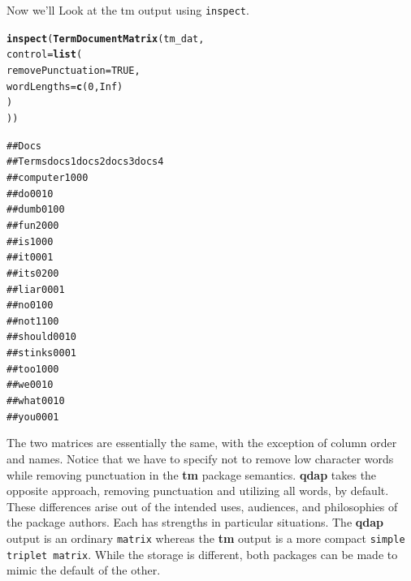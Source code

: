 \documentclass{article}\usepackage[]{graphicx}\usepackage[]{color}
\makeatletter
\newcommand{\hlnum}[1]{\textcolor[rgb]{0.686,0.059,0.569}{#1}}%
\newcommand{\hlstd}[1]{\textcolor[rgb]{0.345,0.345,0.345}{#1}}%
\newcommand{\hlkwc}[1]{\textcolor[rgb]{0.333,0.667,0.333}{#1}}%
\newcommand{\hlkwd}[1]{\textcolor[rgb]{0.737,0.353,0.396}{\textbf{#1}}}%
\newenvironment{kframe}{%
 \def\at@end@of@kframe{}%
 \ifinner\ifhmode%
  \def\at@end@of@kframe{\end{minipage}}%
  \begin{minipage}{\columnwidth}%
 \fi\fi%
 \def\FrameCommand##1{\hskip\@totalleftmargin \hskip-\fboxsep
 \colorbox{shadecolor}{##1}\hskip-\fboxsep
     \hskip-\linewidth \hskip-\@totalleftmargin \hskip\columnwidth}%
 \MakeFramed {\advance\hsize-\width
   \@totalleftmargin\z@ \linewidth\hsize
   \@setminipage}}%
 {\par\unskip\endMakeFramed%
 \at@end@of@kframe}
\newenvironment{knitrout}{}{} %
\makeatother
\begin{document}
\noindent Now we'll Look at the tm output using \texttt{inspect}.

\begin{knitrout}
\color{fgcolor}\begin{kframe}
\begin{alltt}
\hlkwd{inspect}\hlstd{(}\hlkwd{TermDocumentMatrix}\hlstd{(tm_dat,}
    \hlkwc{control} \hlstd{=} \hlkwd{list}\hlstd{(}
        \hlkwc{removePunctuation} \hlstd{=} \hlnum{TRUE}\hlstd{,}
        \hlkwc{wordLengths}\hlstd{=}\hlkwd{c}\hlstd{(}\hlnum{0}\hlstd{,} \hlnum{Inf}\hlstd{)}
    \hlstd{)}
\hlstd{))}
\end{alltt}
\end{kframe}
\end{knitrout}


\begin{knitrout}
\color{fgcolor}\begin{kframe}
\begin{alltt}
##           Docs
## Terms      docs 1 docs 2 docs 3 docs 4
##   computer      1      0      0      0
##   do            0      0      1      0
##   dumb          0      1      0      0
##   fun           2      0      0      0
##   is            1      0      0      0
##   it            0      0      0      1
##   its           0      2      0      0
##   liar          0      0      0      1
##   no            0      1      0      0
##   not           1      1      0      0
##   should        0      0      1      0
##   stinks        0      0      0      1
##   too           1      0      0      0
##   we            0      0      1      0
##   what          0      0      1      0
##   you           0      0      0      1
\end{alltt}
\end{kframe}
\end{knitrout}

The two matrices are essentially the same, with the exception of column order and names.  Notice that we have to specify not to remove low character words while removing punctuation in the \textbf{tm} package semantics.  \textbf{qdap} takes the opposite approach, removing punctuation and utilizing all words, by default.  These differences arise out of the intended uses, audiences, and philosophies of the package authors.  Each has strengths in particular situations.  The \textbf{qdap} output is an ordinary \texttt{matrix} whereas the \textbf{tm} output is a more compact \texttt{simple triplet matrix}.  While the storage is different, both packages can be made to mimic the default of the other.  
\end{document}
